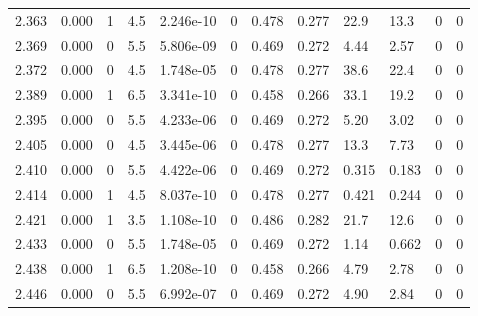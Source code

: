 \documentclass[preview]{standalone}
\begin{document}
{{{{\begin{tabular}{L{1.2cm}C{1.2cm} C{0.3cm}C{0.5cm} C{1.4cm}C{1.4cm} C{1.4cm}C{1.4cm} C{1.6cm}C{1.6cm} C{1.6cm}C{1.6cm}}
  2.363  &  0.000  & 1     & 4.5 &  2.246e-10  & 0  &  0.478&   0.277& 22.9 & 13.3   &  0 & 0  \\ 
  2.369  &  0.000  & 0     & 5.5 &  5.806e-09  & 0  &  0.469&   0.272& 4.44 & 2.57   &  0 & 0  \\ 
  2.372  &  0.000  & 0     & 4.5 &  1.748e-05  & 0  &  0.478&   0.277& 38.6 & 22.4   &  0 & 0  \\ 
  2.389  &  0.000  & 1     & 6.5 &  3.341e-10  & 0  &  0.458&   0.266& 33.1 & 19.2   &  0 & 0  \\ 
  2.395  &  0.000  & 0     & 5.5 &  4.233e-06  & 0  &  0.469&   0.272& 5.20 & 3.02   &  0 & 0  \\ 
  2.405  &  0.000  & 0     & 4.5 &  3.445e-06  & 0  &  0.478&   0.277& 13.3 & 7.73   &  0 & 0  \\ 
  2.410  &  0.000  & 0     & 5.5 &  4.422e-06  & 0  &  0.469&   0.272& 0.315 & 0.183   &  0 & 0  \\ 
  2.414  &  0.000  & 1     & 4.5 &  8.037e-10  & 0  &  0.478&   0.277& 0.421 & 0.244   &  0 & 0  \\ 
  2.421  &  0.000  & 1     & 3.5 &  1.108e-10  & 0  &  0.486&   0.282& 21.7 & 12.6   &  0 & 0  \\ 
  2.433  &  0.000  & 0     & 5.5 &  1.748e-05  & 0  &  0.469&   0.272& 1.14 & 0.662   &  0 & 0  \\ 
  2.438  &  0.000  & 1     & 6.5 &  1.208e-10  & 0  &  0.458&   0.266& 4.79 & 2.78   &  0 & 0  \\ 
  2.446  &  0.000  & 0     & 5.5 &  6.992e-07  & 0  &  0.469&   0.272& 4.90 & 2.84   &  0 & 0  \\ 
\hline 
\end{tabular} 

}}}}
\end{document}
